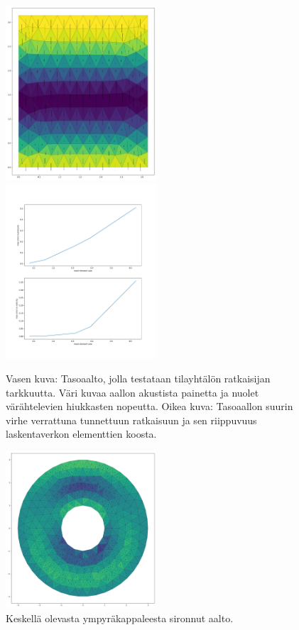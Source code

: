 \documentclass[utf8]{gradu3}
\begin{document}
\begin{figure}[t]
  \includegraphics[width=0.5\textwidth]{research_plan/accuracy_test_wave.png}
  \includegraphics[width=0.5\textwidth]{research_plan/accuracy_test_sizes.png}
  \caption{
  \label{acc_test}
  Vasen kuva: Tasoaalto, jolla testataan tilayhtälön ratkaisijan tarkkuutta.
  Väri kuvaa aallon akustista painetta ja nuolet värähtelevien hiukkasten nopeutta.
  Oikea kuva: Tasoaallon suurin virhe verrattuna tunnettuun ratkaisuun
  ja sen riippuvuus laskentaverkon elementtien koosta.
  }
\end{figure}

\begin{figure}[h]
  \centering
  \includegraphics[width=0.5\textwidth]{research_plan/scatterer.png}
  \caption{
    \label{scatterer}
    Keskellä olevasta ympyräkappaleesta sironnut aalto.
  }
\end{figure}
\end{document}
